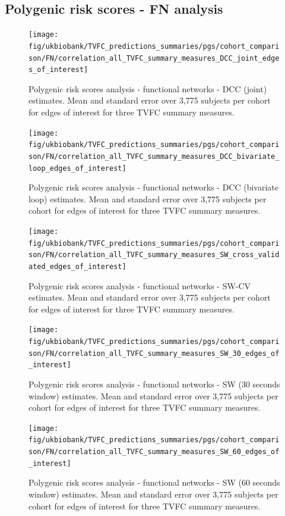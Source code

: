 \clearpage
\subsection{Polygenic risk scores - FN analysis}


\begin{figure}[h]
  \centering
  \texttt{[image: fig/ukbiobank/TVFC\_predictions\_summaries/pgs/cohort\_comparison/FN/correlation\_all\_TVFC\_summary\_measures\_DCC\_joint\_edges\_of\_interest]}
  \caption{
    Polygenic risk scores analysis - functional networks - DCC (joint) estimates.
    Mean and standard error over 3,775 subjects per cohort for edges of interest for three TVFC summary measures.
  }\label{fig:ukb-results-pgs-fn-cohort-comparison-edges-of-interest-dcc-j}
\end{figure}


\begin{figure}[h]
  \centering
  \texttt{[image: fig/ukbiobank/TVFC\_predictions\_summaries/pgs/cohort\_comparison/FN/correlation\_all\_TVFC\_summary\_measures\_DCC\_bivariate\_loop\_edges\_of\_interest]}
  \caption{
    Polygenic risk scores analysis - functional networks - DCC (bivariate loop) estimates.
    Mean and standard error over 3,775 subjects per cohort for edges of interest for three TVFC summary measures.
  }\label{fig:ukb-results-pgs-fn-cohort-comparison-edges-of-interest-dcc-bl}
\end{figure}


\begin{figure}[h]
    \centering
    \texttt{[image: fig/ukbiobank/TVFC\_predictions\_summaries/pgs/cohort\_comparison/FN/correlation\_all\_TVFC\_summary\_measures\_SW\_cross\_validated\_edges\_of\_interest]}
    \caption{
        Polygenic risk scores analysis - functional networks - SW-CV estimates.
        Mean and standard error over 3,775 subjects per cohort for edges of interest for three TVFC summary measures.
    }\label{fig:ukb-results-pgs-fn-cohort-comparison-edges-of-interest-sw-cv}
\end{figure}


\begin{figure}[h]
    \centering
    \texttt{[image: fig/ukbiobank/TVFC\_predictions\_summaries/pgs/cohort\_comparison/FN/correlation\_all\_TVFC\_summary\_measures\_SW\_30\_edges\_of\_interest]}
    \caption{
        Polygenic risk scores analysis - functional networks - SW (30 seconds window) estimates.
        Mean and standard error over 3,775 subjects per cohort for edges of interest for three TVFC summary measures.
    }\label{fig:ukb-results-pgs-fn-cohort-comparison-edges-of-interest-sw-30}
\end{figure}


\begin{figure}[h]
    \centering
    \texttt{[image: fig/ukbiobank/TVFC\_predictions\_summaries/pgs/cohort\_comparison/FN/correlation\_all\_TVFC\_summary\_measures\_SW\_60\_edges\_of\_interest]}
    \caption{
        Polygenic risk scores analysis - functional networks - SW (60 seconds window) estimates.
        Mean and standard error over 3,775 subjects per cohort for edges of interest for three TVFC summary measures.
    }\label{fig:ukb-results-pgs-fn-cohort-comparison-edges-of-interest-sw-60}
\end{figure}
